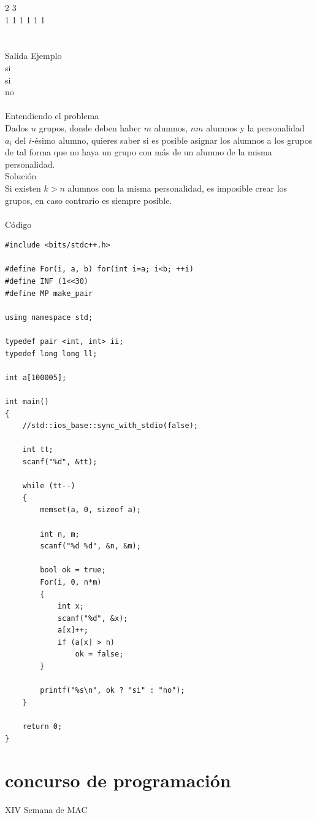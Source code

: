 \documentclass[12pt]{article}
\begin{document}
{{{2 3\\
1 1 1 1 1 1\\
\\
\\
\textrm{\large Salida Ejemplo}
\\
si\\
si\\
no\\
\\
\textrm{\large Entendiendo el problema}\\
Dados $n$ grupos, donde deben haber $m$ alumnos, $nm$ alumnos y la personalidad $a_i$ del $i$-ésimo alumno, quieres saber si es posible asignar los alumnos a los grupos de tal forma que no haya un grupo con más de un alumno de la misma personalidad.
\\
\textrm{\large Solución}\\
Si existen $k > n$ alumnos con la misma personalidad, es imposible crear los grupos, en caso contrario es siempre posible.\\
\\
\textrm{\large Código}\\
\begin{verbatim}
#include <bits/stdc++.h>
 
#define For(i, a, b) for(int i=a; i<b; ++i)
#define INF (1<<30)
#define MP make_pair
 
using namespace std;
 
typedef pair <int, int> ii;
typedef long long ll;
 
int a[100005];
 
int main()
{
    //std::ios_base::sync_with_stdio(false);
 
    int tt;
    scanf("%d", &tt);
 
    while (tt--)
    {
        memset(a, 0, sizeof a);
 
        int n, m;
        scanf("%d %d", &n, &m);
 
        bool ok = true;
        For(i, 0, n*m)
        {
            int x;
            scanf("%d", &x);
            a[x]++;
            if (a[x] > n)
                ok = false;
        }
 
        printf("%s\n", ok ? "si" : "no");
    }
 
    return 0;
}
\end{verbatim}
\newpage
\section{concurso de programación}{\large XIV Semana de MAC}\\

}}}
\end{document}
